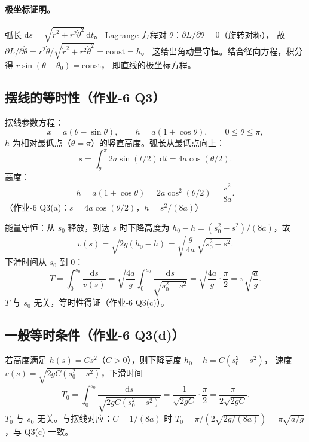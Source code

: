 \documentclass[UTF8,a4paper,11pt]{ctexart}
\begin{document}
\paragraph{极坐标证明。}
弧长 $\mathrm ds=\sqrt{\dot r^2+r^2\dot\theta^2}\,\mathrm dt$。
Lagrange 方程对 $\theta$：$\partial L/\partial\theta=0$（旋转对称），
故 $\partial L/\partial\dot\theta=r^2\dot\theta/\sqrt{\dot r^2+r^2\dot\theta^2}=\mathrm{const}=h$。
这给出角动量守恒。结合径向方程，积分得 $r\sin(\theta-\theta_0)=\mathrm{const}$，
即直线的极坐标方程。

\subsection{摆线的等时性（作业-6 Q3）}
\label{sub:cycloid}

摆线参数方程：
\begin{equation}
  x=a(\theta-\sin\theta),\qquad
  h=a(1+\cos\theta),\qquad 0\le\theta\le\pi,
\end{equation}
$h$ 为相对最低点（$\theta=\pi$）的竖直高度。弧长从最低点向上：
\begin{equation}
  s=\int_\theta^\pi 2a\sin(t/2)\,\mathrm dt
  =4a\cos(\theta/2).
\end{equation}
高度：
\begin{equation}
  h=a(1+\cos\theta)=2a\cos^2(\theta/2)=\frac{s^2}{8a}.
\end{equation}
（作业-6 Q3(a)：$s=4a\cos(\theta/2)$，$h=s^2/(8a)$）

能量守恒：从 $s_0$ 释放，到达 $s$ 时下降高度为 $h_0-h=(s_0^2-s^2)/(8a)$，故
\begin{equation}
  v(s)=\sqrt{2g(h_0-h)}=\sqrt{\frac{g}{4a}}\,\sqrt{s_0^2-s^2}.
\end{equation}
下滑时间从 $s_0$ 到 $0$：
\begin{equation}
  T=\int_0^{s_0}\frac{\mathrm ds}{v(s)}
  =\sqrt{\frac{4a}{g}}\int_0^{s_0}\frac{\mathrm ds}{\sqrt{s_0^2-s^2}}
  =\sqrt{\frac{4a}{g}}\cdot\frac{\pi}{2}
  =\pi\sqrt{\frac{a}{g}}.
\end{equation}
$T$ 与 $s_0$ 无关，等时性得证（作业-6 Q3(c)）。

\subsection{一般等时条件（作业-6 Q3(d)）}
\label{sub:general}

若高度满足 $h(s)=C s^2$（$C>0$），则下降高度 $h_0-h=C(s_0^2-s^2)$，
速度 $v(s)=\sqrt{2gC(s_0^2-s^2)}$，下滑时间
\begin{equation}
  T_0=\int_0^{s_0}\frac{\mathrm ds}{\sqrt{2gC(s_0^2-s^2)}}
  =\frac{1}{\sqrt{2gC}}\cdot\frac{\pi}{2}
  =\frac{\pi}{2\sqrt{2gC}}.
\end{equation}
$T_0$ 与 $s_0$ 无关。与摆线对应：$C=1/(8a)$ 时
$T_0=\pi/(2\sqrt{2g/(8a)})=\pi\sqrt{a/g}$，与 Q3(c) 一致。
\end{document}
